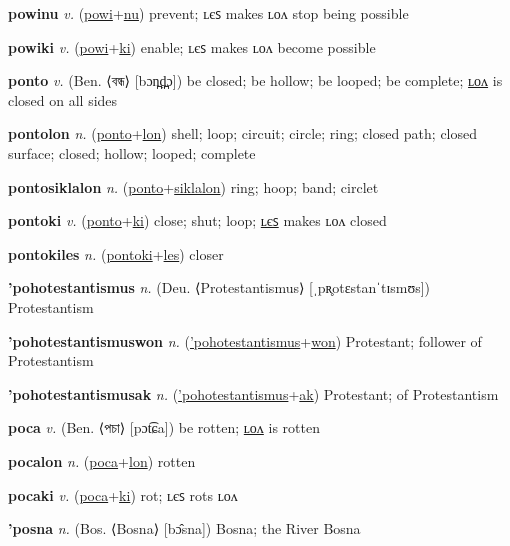 \textbf{\hypertarget{powinu}{powinu}} \textit{v.} (\hyperlink{powi}{powi}+\allowbreak \hyperlink{nu}{nu})
prevent; ʟєꜱ makes ʟᴏᴧ stop being possible

\textbf{\hypertarget{powiki}{powiki}} \textit{v.} (\hyperlink{powi}{powi}+\allowbreak \hyperlink{ki}{ki})
enable; ʟєꜱ makes ʟᴏᴧ become possible

\textbf{\hypertarget{ponto}{ponto}} \textit{v.} (Ben. ⟨{\bengali{}বন্ধ}⟩ [bɔn̪d̪̤ɔ])
be closed; be hollow; be looped; be complete; \hyperlink{pontolon}{ʟᴏᴧ} is closed on all sides

\textbf{\hypertarget{pontolon}{pontolon}} \textit{n.} (\hyperlink{ponto}{ponto}+\allowbreak \hyperlink{lon}{lon})
shell; loop; circuit; circle; ring; closed path; closed surface; closed; hollow; looped; complete

\textbf{\hypertarget{pontosiklalon}{pontosiklalon}} \textit{n.} (\hyperlink{ponto}{ponto}+\allowbreak \hyperlink{siklalon}{siklalon})
ring; hoop; band; circlet

\textbf{\hypertarget{pontoki}{pontoki}} \textit{v.} (\hyperlink{ponto}{ponto}+\allowbreak \hyperlink{ki}{ki})
close; shut; loop; \hyperlink{pontokiles}{ʟєꜱ} makes ʟᴏᴧ closed

\textbf{\hypertarget{pontokiles}{pontokiles}} \textit{n.} (\hyperlink{pontoki}{pontoki}+\allowbreak \hyperlink{les}{les})
closer

\textbf{\hypertarget{'pohotestantismus}{'pohotestantismus}} \textit{n.} (Deu. ⟨Protestantismus⟩ [ˌpʀ̥otɛstanˈtɪsmʊs])
Protestantism

\textbf{\hypertarget{'pohotestantismuswon}{'pohotestantismuswon}} \textit{n.} (\hyperlink{'pohotestantismus}{'pohotestantismus}+\allowbreak \hyperlink{won}{won})
Protestant; follower of Protestantism

\textbf{\hypertarget{'pohotestantismusak}{'pohotestantismusak}} \textit{n.} (\hyperlink{'pohotestantismus}{'pohotestantismus}+\allowbreak \hyperlink{ak}{ak})
Protestant; of Protestantism

\textbf{\hypertarget{poca}{poca}} \textit{v.} (Ben. ⟨{\bengali{}পচা}⟩ [pɔt͡ɕa])
be rotten; \hyperlink{pocalon}{ʟᴏᴧ} is rotten

\textbf{\hypertarget{pocalon}{pocalon}} \textit{n.} (\hyperlink{poca}{poca}+\allowbreak \hyperlink{lon}{lon})
rotten

\textbf{\hypertarget{pocaki}{pocaki}} \textit{v.} (\hyperlink{poca}{poca}+\allowbreak \hyperlink{ki}{ki})
rot; ʟєꜱ rots ʟᴏᴧ

\textbf{\hypertarget{'posna}{'posna}} \textit{n.} (Bos. ⟨Bosna⟩ [bɔ̂sna])
Bosna; the River Bosna

